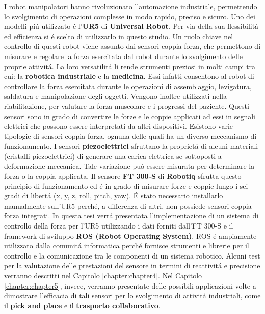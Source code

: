 I robot manipolatori hanno rivoluzionato l'automazione industriale, permettendo lo svolgimento
di operazioni complesse in modo rapido, preciso e sicuro. 
Uno dei modelli pi\'{u} utilizzato \'{e} l'\textbf{UR5} di \textbf{Universal Robot}. Per via della sua flessibilit\'{a} 
ed efficienza si \'{e} scelto di utilizzarlo in questo studio. 
Un ruolo chiave nel controllo di questi robot viene assunto dai sensori coppia-forza,
che permettono di misurare e regolare la forza esercitata dal robot durante lo svolgimento delle proprie attivit\'{a}. 
La loro versatilit\'{a} li rende strumenti preziosi in molti campi tra cui: la \textbf{robotica industriale} e la \textbf{medicina}. 
Essi infatti consentono al robot di controllare la forza esercitata durante le operazioni di assemblaggio, levigatura, 
saldatura e manipolazione degli oggetti. Vengono inoltre utilizzati nella riabilitazione, per valutare la forza muscolare 
e i progressi del paziente.
Questi sensori sono in grado di convertire le forze e le coppie applicati ad essi in segnali elettrici che possono essere 
interpretati da altri dispositivi. 
Esistono varie tipologie di sensori coppia-forza, ognuna delle quali ha un diverso meccanismo di funzionamento. 
I sensori \textbf{piezoelettrici} sfruttano la propriet\'{a} di alcuni materiali (cristalli piezoelettrici) 
di generare una carica elettrica se sottoposti a deformazione meccanica. Tale variazione  
pu\'{o} essere misurata per determinare la forza o la coppia applicata.
Il sensore \textbf{FT 300-S} di \textbf{Robotiq} sfrutta questo principio di funzionamento ed \'{e} in grado di misurare 
forze e coppie lungo i sei gradi di libert\'{a} (x, y, z, roll, pitch, yaw). 
\'{E} stato necessario installarlo manualmente sull'UR5 perch\'{e}, a differenza di altri, non possiede sensori 
coppia-forza integrati. 
In questa tesi verr\'{a} presentata l'implementazione di un sistema di controllo della forza per l'UR5 utilizzando i dati
forniti dall'FT 300-S e il framework di sviluppo \textbf{ROS (Robot Operating System)}.
ROS \'{e} ampiamente utilizzato dalla comunit\'{a} informatica perch\'{e} fornisce strumenti e librerie 
per il controllo e la comunicazione tra le componenti di un sistema robotico.
Alcuni test per la valutazione delle prestazioni del sensore in termini di reattivit\'{a} e precisione verranno descritti nel Capitolo 
\ref{chapter:chapter4}.
Nel Capitolo \ref{chapter:chapter5}, invece, verranno presentate delle possibili applicazioni volte a dimostrare l'efficacia
di tali sensori per lo svolgimento di attivit\'{a} industriali, come il \textbf{pick and place} e il \textbf{trasporto collaborativo}.
